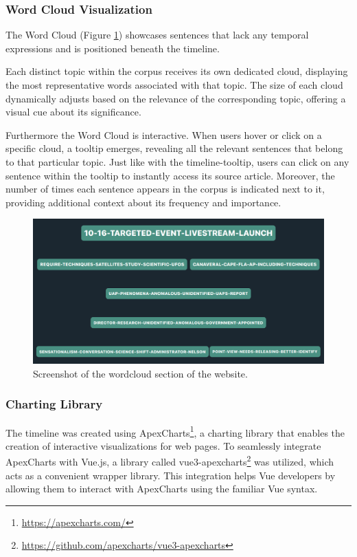 \documentclass[12pt,oneside,bibtotoc,liststotoc]{scrbook}
\begin{document}
\subsubsection{Word Cloud Visualization}
The Word Cloud (Figure \ref{fig:wordcloud_website}) showcases sentences that lack any temporal expressions and is positioned beneath the timeline.

Each distinct topic within the corpus receives its own dedicated cloud, displaying the most representative words associated with that topic. The size of each cloud dynamically adjusts based on the relevance of the corresponding topic, offering a visual cue about its significance.

Furthermore the Word Cloud is interactive. When users hover or click on a specific cloud, a tooltip emerges, revealing all the relevant sentences that belong to that particular topic. Just like with the timeline-tooltip, users can click on any sentence within the tooltip to instantly access its source article. Moreover, the number of times each sentence appears in the corpus is indicated next to it, providing additional context about its frequency and importance.

\begin{figure}[H]
\centering
\includegraphics[width=15cm]{img/wordcloud.png}
\caption{Screenshot of the wordcloud section of the website.}
\label{fig:wordcloud_website}
\end{figure}

\subsubsection{Charting Library}
The timeline was created using ApexCharts\footnote{\url{https://apexcharts.com/}}, a charting library that enables the creation of interactive visualizations for web pages. To seamlessly integrate ApexCharts with Vue.js, a library called vue3-apexcharts\footnote{\url{https://github.com/apexcharts/vue3-apexcharts}} was utilized, which acts as a convenient wrapper library. This integration helps Vue developers by allowing them to interact with ApexCharts using the familiar Vue syntax.
\end{document}
